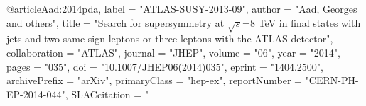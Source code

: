@article{Aad:2014pda,
      label          = "ATLAS-SUSY-2013-09",
      author         = "Aad, Georges and others",
      title          = "{Search for supersymmetry at $\sqrt{s}$=8 TeV in final
                        states with jets and two same-sign leptons or three
                        leptons with the ATLAS detector}",
      collaboration  = "ATLAS",
      journal        = "JHEP",
      volume         = "06",
      year           = "2014",
      pages          = "035",
      doi            = "10.1007/JHEP06(2014)035",
      eprint         = "1404.2500",
      archivePrefix  = "arXiv",
      primaryClass   = "hep-ex",
      reportNumber   = "CERN-PH-EP-2014-044",
      SLACcitation   = "%
}

